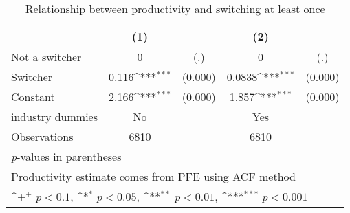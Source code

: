 \begin{table}[htbp]\centering
\def\sym#1{\ifmmode^{#1}\else\(^{#1}\)\fi}
\caption{Relationship between productivity and switching at least once}
\begin{tabular}{l*{2}{cc}}
\toprule
                    &\multicolumn{1}{c}{(1)}         &            &\multicolumn{1}{c}{(2)}         &            \\
\midrule
Not a switcher      &           0         &         (.)&           0         &         (.)\\
Switcher            &       0.116\sym{***}&     (0.000)&      0.0838\sym{***}&     (0.000)\\
Constant            &       2.166\sym{***}&     (0.000)&       1.857\sym{***}&     (0.000)\\
industry dummies    &          No         &            &         Yes         &            \\
\midrule
Observations        &        6810         &            &        6810         &            \\
\bottomrule
\multicolumn{5}{l}{\footnotesize \textit{p}-values in parentheses}\\
\multicolumn{5}{l}{\footnotesize Productivity estimate comes from PFE using ACF method}\\
\multicolumn{5}{l}{\footnotesize \sym{+} \(p<0.1\), \sym{*} \(p<0.05\), \sym{**} \(p<0.01\), \sym{***} \(p<0.001\)}\\
\end{tabular}
\end{table}
